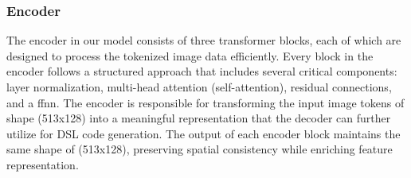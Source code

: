 \subsubsection{Encoder}
The encoder in our model consists of three transformer blocks, each of which are designed to process the tokenized image data efficiently. Every block in the encoder follows a structured approach that includes several critical components: layer normalization, multi-head attention (self-attention), residual connections, and a \gls{ffnn}.
The encoder is responsible for transforming the input image tokens of shape (513x128) into a meaningful representation that the decoder can further utilize for DSL code generation. The output of each encoder block maintains the same shape of (513x128), preserving spatial consistency while enriching feature representation.

